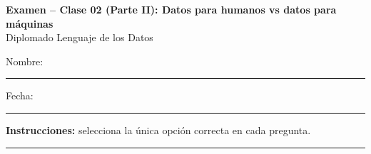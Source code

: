 \documentclass[12pt,addpoints]{exam}
\begin{document}
\begin{center}
  {\color{molMorado}\Large\bfseries Examen -- Clase 02 (Parte II):
   Datos para humanos vs datos para m\'aquinas}\\[3pt]
  {\color{molTeal}\large Diplomado Lenguaje de los Datos}
\end{center}

\vspace{6pt}
\noindent Nombre: \rule{6cm}{0.4pt} \hfill Fecha: \rule{3cm}{0.4pt}

\vspace{6pt}
\noindent\textbf{Instrucciones:} selecciona la \'unica opci\'on correcta en cada
pregunta.

\vspace{4pt}
\hrule
\vspace{8pt}
\end{document}

